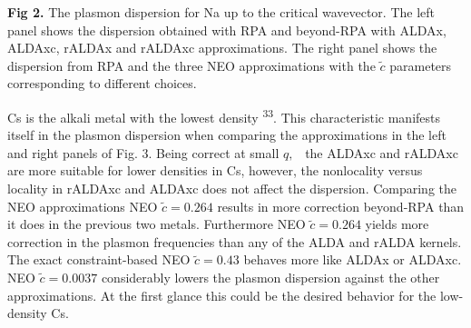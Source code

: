 \documentclass[12pt]{article}
\renewcommand{\_}{\kern-1.5pt\textunderscore\kern-1.5pt}
\begin{document}

\setlength{\parskip}{0.0pt}
\par


\vspace{\baselineskip}
\setlength{\parskip}{9.96pt}
\setlength{\parskip}{0.0pt}
\begin{justify}
\textbf{Fig 2. }The plasmon dispersion for Na up to the critical wavevector. The left panel shows the dispersion obtained with RPA and beyond-RPA with ALDAx, ALDAxc, rALDAx and rALDAxc approximations. The right panel shows the dispersion from RPA and the three NEO approximations with the  \( \widetilde{c} \)  parameters corresponding to different choices.
\end{justify}\par


\vspace{\baselineskip}
\setlength{\parskip}{9.96pt}
\setlength{\parskip}{0.0pt}
\begin{justify}
Cs is the alkali metal with the lowest density \textsuperscript{33}. This characteristic manifests itself in the plasmon dispersion when comparing the approximations in the left and right panels of Fig. 3. Being correct at small  \( q, \) \ the ALDAxc and rALDAxc  are more suitable for lower densities in Cs, however, the nonlocality versus locality in rALDAxc and ALDAxc does not affect the dispersion. Comparing the NEO approximations NEO  \( \widetilde{c}=0.264 \)  results in more correction beyond-RPA than it does in the previous two metals. Furthermore NEO  \( \widetilde{c}=0.264 \)  yields more correction in the plasmon frequencies than any of the ALDA and rALDA kernels. The exact constraint-based NEO  \( \widetilde{c}=0.43 \)  behaves more like ALDAx or ALDAxc. NEO  \( \widetilde{c}=0.0037 \)  considerably lowers the plasmon dispersion against the other approximations. At the first glance this could be the desired behavior for the low-density Cs.
\end{justify}\par


\vspace{\baselineskip}
\setlength{\parskip}{9.96pt}

\vspace{\baselineskip}
\setlength{\parskip}{0.0pt}
\setlength{\parskip}{9.96pt}


\end{document}
